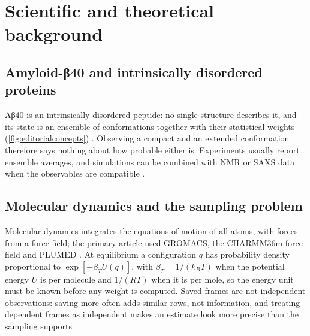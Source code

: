 \chapter{Scientific and theoretical background}
\label{ch:background}
\section{Amyloid-β40 and intrinsically disordered proteins}
Aβ40 is an intrinsically disordered peptide: no single structure describes it, and its state is an ensemble of conformations together with their statistical weights (\cref{fig:editorialconcepts}) \autocite{vanderlee2014,cadenelli2026}. Observing a compact and an extended conformation therefore says nothing about how probable either is. Experiments usually report ensemble averages, and simulations can be combined with NMR or SAXS data when the observables are compatible \autocite{borthakur2025}.

\section{Molecular dynamics and the sampling problem}
Molecular dynamics integrates the equations of motion of all atoms, with forces from a force field; the primary article used GROMACS, the CHARMM36m force field and PLUMED \autocite{cadenelli2026,abraham2015,huang2017,tribello2014}. At equilibrium a configuration $q$ has probability density proportional to $\exp[-\beta_T U(q)]$, with $\beta_T=1/(k_BT)$ when the potential energy $U$ is per molecule and $1/(RT)$ when it is per mole, so the energy unit must be known before any weight is computed. Saved frames are not independent observations: saving more often adds similar rows, not information, and treating dependent frames as independent makes an estimate look more precise than the sampling supports \autocite{chodera2016,grossfield2019}.

